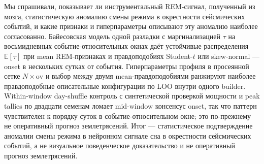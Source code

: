 Мы спрашивали, показывает ли инструментальный REM-сигнал, полученный из мозга, статистическую аномалию смены режима в окрестности сейсмических событий, и какие признаки и гиперпараметры описывают эту аномалию наиболее согласованно. Байесовская модель одной разладки с маргинализацией \(\tau\) на восьмидневных событие-относительных окнах даёт устойчивые распределения \(\mathbb{E}[\tau]\) при mean REM-признаках и правдоподобиях Student-\(t\) или skew-normal — onset в нескольких сутках от события. Гиперпараметры профиля в просеянной сетке \(N\times\mathrm{ov}\) и выбор между двумя mean-правдоподобиями ранжируют наиболее правдоподобные описательные конфигурации по LOO внутри одного builder. Within-window day-shuffle контроль с синтетической проверкой мощности и peak tallies по двадцати семенам ломает mid-window консенсус onset, так что паттерн чувствителен к порядку суток в событие-относительном окне; это по-прежнему не оперативный прогноз землетрясений. Итог — статистическое подтверждение аномалии смены режима в нейронном сигнале сна в окрестности сейсмических событий, а не визуальное поведенческое доказательство и не оперативный прогноз землетрясений.
